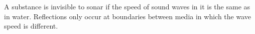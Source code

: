 A substance is invisible to sonar if the speed of sound waves in it is
the same as in water. Reflections only occur at boundaries between media
in which the wave speed is different.



